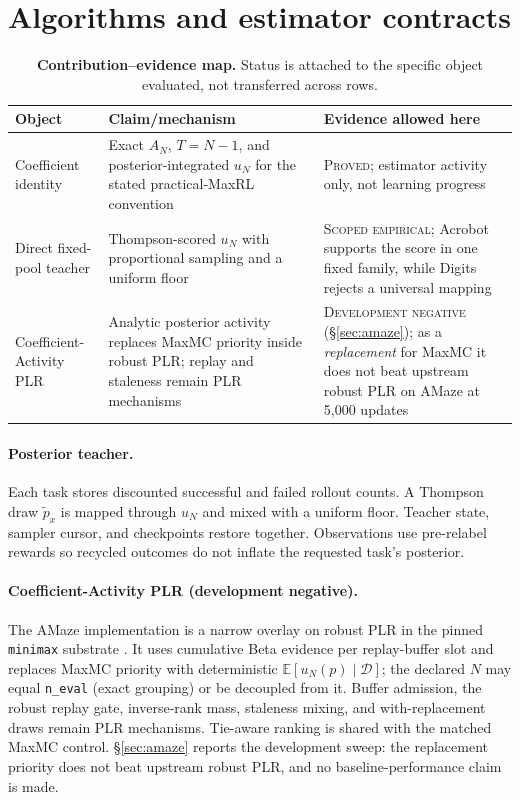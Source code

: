 \section{Algorithms and estimator contracts}
\label{app:algs}
\begin{table}[t]
\centering
\scriptsize
\setlength{\tabcolsep}{3pt}
\caption{\textbf{Contribution--evidence map.} Status is attached to the
specific object evaluated, not transferred across rows.}
\label{tab:instantiations}
\begin{tabular}{@{}p{.20\linewidth}p{.34\linewidth}p{.38\linewidth}@{}}
\toprule
Object & Claim/mechanism & Evidence allowed here \\
\midrule
Coefficient identity & Exact $A_N$, $T=N-1$, and posterior-integrated $u_N$ for the stated practical-MaxRL convention & \textsc{Proved}; estimator activity only, not learning progress \\
Direct fixed-pool teacher & Thompson-scored $u_N$ with proportional sampling and a uniform floor & \textsc{Scoped empirical}; Acrobot supports the score in one fixed family, while Digits rejects a universal mapping \\
Coefficient-Activity PLR & Analytic posterior activity replaces MaxMC priority inside robust PLR; replay and staleness remain PLR mechanisms & \textsc{Development negative} (\S\ref{sec:amaze}); as a \emph{replacement} for MaxMC it does not beat upstream robust PLR on AMaze at 5{,}000 updates \\
\bottomrule
\end{tabular}
\end{table}
\label{app:algorithms}

\paragraph{Posterior teacher.}
Each task stores discounted successful and failed rollout counts. A Thompson
draw $\tilde p_x$ is mapped through $u_N$ and mixed with a uniform floor.
Teacher state, sampler cursor, and checkpoints restore together. Observations
use pre-relabel rewards so recycled outcomes do not inflate the requested
task's posterior.

\paragraph{Coefficient-Activity PLR (development negative).}
The AMaze implementation is a narrow overlay on robust PLR in the pinned
\texttt{minimax} substrate \citep{plr,minimax}. It uses cumulative Beta
evidence per replay-buffer slot and replaces MaxMC priority with deterministic
$\mathbb E[u_N(p)\mid\mathcal D]$; the declared $N$ may equal
\texttt{n\_eval} (exact grouping) or be decoupled from it. Buffer admission,
the robust replay gate, inverse-rank mass, staleness mixing, and
with-replacement draws remain PLR mechanisms. Tie-aware ranking is shared with
the matched MaxMC control. \S\ref{sec:amaze} reports the development sweep:
the replacement priority does not beat upstream robust PLR, and no
baseline-performance claim is made.

